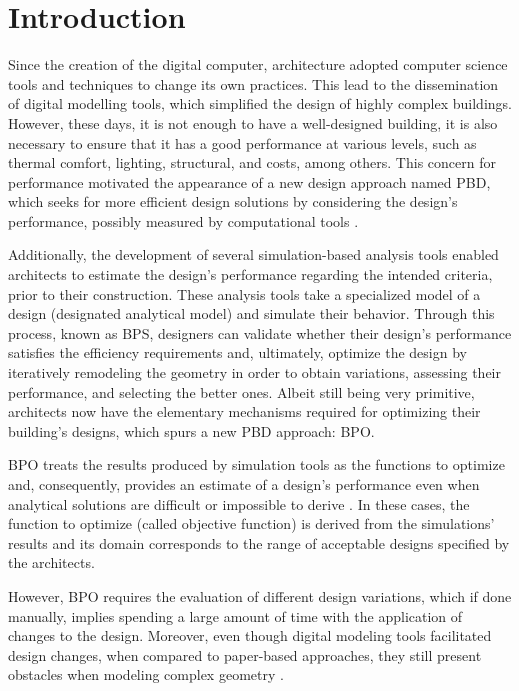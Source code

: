 \section{Introduction}
\label{sec:intro}
	
	Since the creation of the digital computer, architecture adopted computer science tools and techniques to change its own practices. This lead to the dissemination of digital modelling tools, which simplified the design of highly complex buildings. However, these days, it is not enough to have a well-designed building, it is also necessary to ensure that it has a good performance at various levels, such as thermal comfort, lighting, structural, and costs, among others. This concern for performance motivated the appearance of a new design approach named \ac{PBD}, which seeks for more efficient design solutions by considering the design's performance, possibly measured by computational tools \cite{Oxman2006PBD}. 
	
	Additionally, the development of several simulation-based analysis tools enabled architects to estimate the design's performance regarding the intended criteria, prior to their construction. These analysis tools take a specialized model of a design (designated analytical model) and simulate their behavior. Through this process, known as \ac{BPS},
	designers can validate whether their design's performance satisfies the efficiency requirements and, ultimately, optimize the design by iteratively remodeling the geometry in order to obtain variations, assessing their performance, and selecting the better ones. Albeit still being very primitive, architects now have the elementary mechanisms required for optimizing their building's designs, which spurs a new \ac{PBD} approach: \ac{BPO}.
	
	\ac{BPO} treats the results produced by simulation tools as the functions to optimize and, consequently, provides an estimate of a design's performance even when analytical solutions are difficult or impossible to derive \cite{Kolda2003}. In these cases, the function to optimize (called objective function) is derived from the simulations' results and its domain corresponds to the range of acceptable designs specified by the architects.
	
	However, \ac{BPO} requires the evaluation of different design variations, which if done manually, implies spending a large amount of time with the application of changes to the design. Moreover, even though digital modeling tools facilitated design changes, when compared to paper-based approaches, they still present obstacles when modeling complex geometry \cite{Ferreira2015GD}.
	

